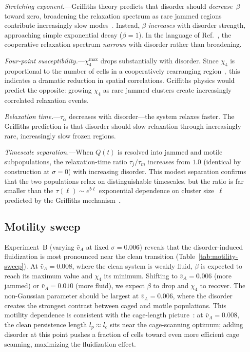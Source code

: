 \documentclass[aps,pre,twocolumn,superscriptaddress,longbibliography,floatfix]{revtex4-2}
\begin{document}
\textit{Stretching exponent.}---Griffiths theory predicts that disorder
should \emph{decrease}~$\beta$ toward zero, broadening the relaxation
spectrum as rare jammed regions contribute increasingly slow
modes~\cite{vojta2006}.  Instead, $\beta$ \emph{increases} with
disorder strength, approaching simple
exponential decay ($\beta\!=\!1$).  In the language of
Ref.~\cite{berthier2011}, the cooperative relaxation spectrum
\emph{narrows} with disorder rather than broadening.

\textit{Four-point susceptibility.}---$\chi_4^{\max}$ drops
substantially with disorder.  Since $\chi_4$ is
proportional to the number of cells in a cooperatively rearranging
region~\cite{berthier2011}, this indicates a dramatic reduction in
spatial correlations.  Griffiths physics would predict the opposite:
growing $\chi_4$ as rare jammed clusters create increasingly correlated
relaxation events.

\textit{Relaxation time.}---$\tau_\alpha$ decreases
with disorder---the system relaxes faster.
The Griffiths prediction is that disorder should slow
relaxation through increasingly rare, increasingly slow frozen regions.

\textit{Timescale separation.}---When $Q(t)$ is resolved into jammed
and motile subpopulations, the relaxation-time ratio $\tau_j/\tau_m$
increases from $1.0$ (identical by construction at $\sigma\!=\!0$)
with increasing disorder.
This modest separation confirms that
the two populations relax on distinguishable timescales, but the ratio
is far smaller than the $\tau(\ell)\!\sim\!e^{b\ell}$ exponential
dependence on cluster size~$\ell$ predicted by the Griffiths
mechanism~\cite{vojta2006}.

\subsection{Motility sweep}
\label{sec:motility-sweep}

Experiment~B (varying $\bar{v}_A$ at fixed $\sigma\!=\!0.006$) reveals
that the disorder-induced fluidization is most pronounced near the
clean transition (Table~\ref{tab:motility-sweep}).  At $\bar{v}_A\!=\!0.008$, where the clean system is
weakly fluid, $\beta$ is expected to reach its maximum value and $\chi_4$
its minimum.  Shifting to $\bar{v}_A\!=\!0.006$ (more jammed)
or $\bar{v}_A\!=\!0.010$ (more fluid), we expect $\beta$ to drop
and $\chi_4$ to recover.  The non-Gaussian
parameter should be largest at $\bar{v}_A\!=\!0.006$,
where the disorder creates the strongest contrast between
caged and motile populations.  This motility dependence is consistent
with the cage-length picture~\cite{debets2021}: at
$\bar{v}_A\!=\!0.008$, the clean persistence length $l_p\!\approx\!l_c$
sits near the cage-scanning optimum; adding disorder at this point
pushes a fraction of cells toward even more efficient cage scanning,
maximizing the fluidization effect.
\end{document}
